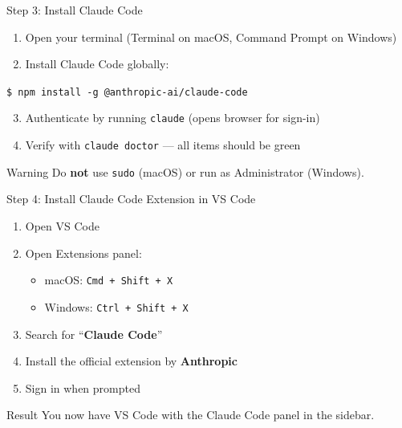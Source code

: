 \documentclass[aspectratio=169,xcolor=dvipsnames]{beamer}
\begin{document}
\begin{frame}{Step 3: Install Claude Code}
  \begin{enumerate}
    \item Open your terminal (Terminal on macOS, Command Prompt on Windows)
    \item Install Claude Code globally:
  \end{enumerate}

  \vspace{0.5em}
  \begin{center}
    \colorbox{codebg}{%
      \parbox{0.7\textwidth}{%
        \texttt{\textcolor{codegreen}{\$ npm install -g @anthropic-ai/claude-code}}
      }%
    }
  \end{center}

  \vspace{0.5em}
  \begin{enumerate}
    \setcounter{enumi}{2}
    \item Authenticate by running \texttt{claude} (opens browser for sign-in)
    \item Verify with \texttt{claude doctor} --- all items should be green
  \end{enumerate}

  \vspace{0.5em}
  \begin{alertblock}{Warning}
    Do \textbf{not} use \texttt{sudo} (macOS) or run as Administrator (Windows).
  \end{alertblock}
\end{frame}

\begin{frame}{Step 4: Install Claude Code Extension in VS Code}
  \begin{enumerate}
    \item Open VS Code
    \item Open Extensions panel:
      \begin{itemize}
        \item macOS: \texttt{Cmd + Shift + X}
        \item Windows: \texttt{Ctrl + Shift + X}
      \end{itemize}
    \item Search for ``\textbf{Claude Code}''
    \item Install the official extension by \textbf{Anthropic}
    \item Sign in when prompted
  \end{enumerate}

  \vspace{0.5em}
  \begin{block}{Result}
    You now have VS Code with the Claude Code panel in the sidebar.
  \end{block}
\end{frame}
\end{document}
